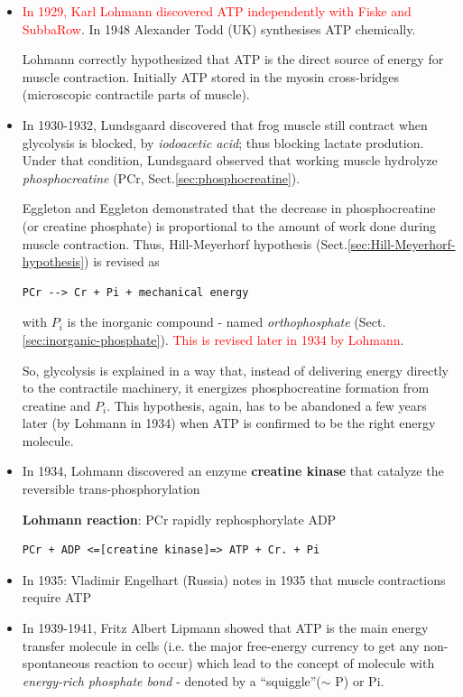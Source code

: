 \begin{itemize}
\item \textcolor{red}{In 1929, Karl Lohmann discovered ATP independently with
Fiske and SubbaRow}.  In 1948 Alexander Todd (UK) synthesises ATP chemically.

Lohmann correctly hypothesized that ATP is the direct source of energy for
muscle contraction. Initially ATP stored in the myosin cross-bridges
(microscopic contractile parts of muscle). 


\item In 1930-1932, Lundsgaard discovered that frog muscle still contract when
  glycolysis is blocked, by {\it iodoacetic acid}; thus blocking lactate
  prodution. Under that condition, Lundsgaard observed that working muscle
  hydrolyze {\it phosphocreatine} (PCr, Sect.\ref{sec:phosphocreatine}). 
  
  Eggleton and Eggleton demonstrated that the decrease in phosphocreatine (or
  creatine phosphate) is proportional to the amount of work done during muscle
  contraction. Thus, Hill-Meyerhorf hypothesis
  (Sect.\ref{sec:Hill-Meyerhorf-hypothesis}) is revised as

\begin{verbatim}
PCr --> Cr + Pi + mechanical energy
\end{verbatim}
  with $P_i$ is the inorganic compound - named {\it orthophosphate}
  (Sect.\ref{sec:inorganic-phosphate}). \textcolor{red}{This is revised later
  in 1934 by Lohmann}.

  So, glycolysis is explained in a way that, instead of delivering energy
  directly to the contractile machinery, it energizes phosphocreatine formation
  from creatine and $P_i$. This hypothesis, again, has to be abandoned a few
  years later (by Lohmann in 1934) when ATP is confirmed to be the right
  energy molecule.

\item In 1934, Lohmann discovered an enzyme {\bf creatine kinase} that catalyze
the reversible trans-phosphorylation

\label{sec:Lohmann-reaction}
{\bf Lohmann reaction}: PCr rapidly rephosphorylate ADP
\begin{verbatim}
PCr + ADP <=[creatine kinase]=> ATP + Cr. + Pi
\end{verbatim}

 \item In 1935: Vladimir Engelhart (Russia) notes in 1935 that muscle
 contractions require ATP

\item In 1939-1941, Fritz Albert Lipmann showed that ATP is the main energy
transfer molecule in cells (i.e. the major free-energy currency to get any
non-spontaneous reaction to occur) which lead to the concept of molecule
with {\it energy-rich phosphate bond} - denoted by a ``squiggle''($\sim$ P) or
Pi.
  

\end{itemize}

